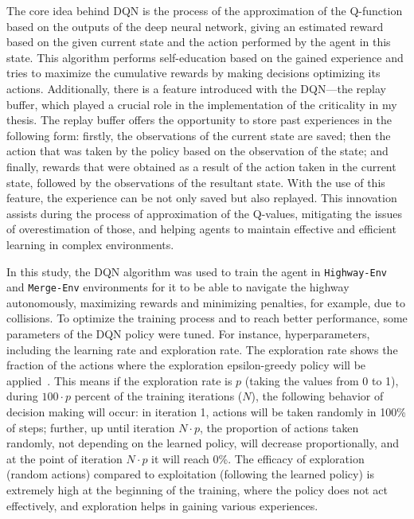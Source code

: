 The core idea behind DQN is the process of the approximation of the Q-function based on the outputs of the deep neural network, giving an estimated reward based on the given current state and the action performed by the agent in this state. This algorithm performs self-education based on the gained experience and tries to maximize the cumulative rewards by making decisions optimizing its actions. Additionally, there is a feature introduced with the DQN---the replay buffer, which played a crucial role in the implementation of the criticality in my thesis. The replay buffer offers the opportunity to store past experiences in the following form: firstly, the observations of the current state are saved; then the action that was taken by the policy based on the observation of the state; and finally, rewards that were obtained as a result of the action taken in the current state, followed by the observations of the resultant state. With the use of this feature, the experience can be not only saved but also replayed. This innovation assists during the process of approximation of the Q-values, mitigating the issues of overestimation of those, and helping agents to maintain effective and efficient learning in complex environments.

In this study, the DQN algorithm was used to train the agent in \texttt{Highway-Env}~\cite{highway-env} and \texttt{Merge-Env} environments for it to be able to navigate the highway autonomously, maximizing rewards and minimizing penalties, for example, due to collisions. To optimize the training process and to reach better performance, some parameters of the DQN policy were tuned. For instance, hyperparameters, including the learning rate and exploration rate. The exploration rate shows the fraction of the actions where the exploration epsilon-greedy policy will be applied~\cite{tokic2011adaptive}. This means if the exploration rate is $p$ (taking the values from 0 to 1), during $100 \cdot p$ percent of the training iterations ($N$), the following behavior of decision making will occur: in iteration 1, actions will be taken randomly in 100\% of steps; further, up until iteration $N \cdot p$, the proportion of actions taken randomly, not depending on the learned policy, will decrease proportionally, and at the point of iteration $N \cdot p$ it will reach 0\%. The efficacy of exploration (random actions) compared to exploitation (following the learned policy) is extremely high at the beginning of the training, where the policy does not act effectively, and exploration helps in gaining various experiences.

